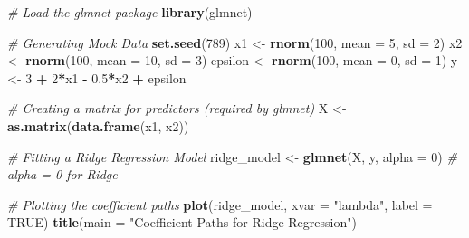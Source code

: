\documentclass[
  12 pt,
  a4paper,
]{book}
\newenvironment{Shaded}{\begin{snugshade}}{\end{snugshade}}
\newcommand{\AttributeTok}[1]{\textcolor[rgb]{0.13,0.29,0.53}{#1}}
\newcommand{\CommentTok}[1]{\textcolor[rgb]{0.56,0.35,0.01}{\textit{#1}}}
\newcommand{\ConstantTok}[1]{\textcolor[rgb]{0.56,0.35,0.01}{#1}}
\newcommand{\DecValTok}[1]{\textcolor[rgb]{0.00,0.00,0.81}{#1}}
\newcommand{\FloatTok}[1]{\textcolor[rgb]{0.00,0.00,0.81}{#1}}
\newcommand{\FunctionTok}[1]{\textcolor[rgb]{0.13,0.29,0.53}{\textbf{#1}}}
\newcommand{\NormalTok}[1]{#1}
\newcommand{\OtherTok}[1]{\textcolor[rgb]{0.56,0.35,0.01}{#1}}
\newcommand{\SpecialCharTok}[1]{\textcolor[rgb]{0.81,0.36,0.00}{\textbf{#1}}}
\newcommand{\StringTok}[1]{\textcolor[rgb]{0.31,0.60,0.02}{#1}}
\numberwithin{equation}{section}
\theoremstyle{plain}      %
\theoremstyle{definition} %
\theoremstyle{remark}     %
\theoremstyle{note}         %
\begin{document}
\begin{Shaded}
\begin{Highlighting}[]
\CommentTok{\# Load the glmnet package}
\FunctionTok{library}\NormalTok{(glmnet)}

\CommentTok{\# Generating Mock Data}
\FunctionTok{set.seed}\NormalTok{(}\DecValTok{789}\NormalTok{)}
\NormalTok{x1 }\OtherTok{\textless{}{-}} \FunctionTok{rnorm}\NormalTok{(}\DecValTok{100}\NormalTok{, }\AttributeTok{mean =} \DecValTok{5}\NormalTok{, }\AttributeTok{sd =} \DecValTok{2}\NormalTok{)}
\NormalTok{x2 }\OtherTok{\textless{}{-}} \FunctionTok{rnorm}\NormalTok{(}\DecValTok{100}\NormalTok{, }\AttributeTok{mean =} \DecValTok{10}\NormalTok{, }\AttributeTok{sd =} \DecValTok{3}\NormalTok{)}
\NormalTok{epsilon }\OtherTok{\textless{}{-}} \FunctionTok{rnorm}\NormalTok{(}\DecValTok{100}\NormalTok{, }\AttributeTok{mean =} \DecValTok{0}\NormalTok{, }\AttributeTok{sd =} \DecValTok{1}\NormalTok{)}
\NormalTok{y }\OtherTok{\textless{}{-}} \DecValTok{3} \SpecialCharTok{+} \DecValTok{2}\SpecialCharTok{*}\NormalTok{x1 }\SpecialCharTok{{-}} \FloatTok{0.5}\SpecialCharTok{*}\NormalTok{x2 }\SpecialCharTok{+}\NormalTok{ epsilon}

\CommentTok{\# Creating a matrix for predictors (required by glmnet)}
\NormalTok{X }\OtherTok{\textless{}{-}} \FunctionTok{as.matrix}\NormalTok{(}\FunctionTok{data.frame}\NormalTok{(x1, x2))}

\CommentTok{\# Fitting a Ridge Regression Model}
\NormalTok{ridge\_model }\OtherTok{\textless{}{-}} \FunctionTok{glmnet}\NormalTok{(X, y, }\AttributeTok{alpha =} \DecValTok{0}\NormalTok{) }\CommentTok{\# alpha = 0 for Ridge}

\CommentTok{\# Plotting the coefficient paths}
\FunctionTok{plot}\NormalTok{(ridge\_model, }\AttributeTok{xvar =} \StringTok{"lambda"}\NormalTok{, }\AttributeTok{label =} \ConstantTok{TRUE}\NormalTok{)}
\FunctionTok{title}\NormalTok{(}\AttributeTok{main =} \StringTok{"Coefficient Paths for Ridge Regression"}\NormalTok{)}
\end{Highlighting}
\end{Shaded}
\end{document}
